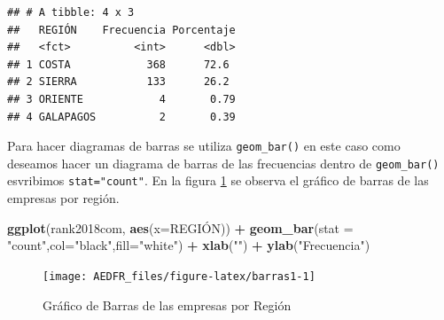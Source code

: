 \documentclass[letterpaper,]{book}
\newenvironment{Shaded}{\begin{snugshade}}{\end{snugshade}}
\newcommand{\DataTypeTok}[1]{\textcolor[rgb]{0.13,0.29,0.53}{#1}}
\newcommand{\DecValTok}[1]{\textcolor[rgb]{0.00,0.00,0.81}{#1}}
\newcommand{\KeywordTok}[1]{\textcolor[rgb]{0.13,0.29,0.53}{\textbf{#1}}}
\newcommand{\NormalTok}[1]{#1}
\newcommand{\OperatorTok}[1]{\textcolor[rgb]{0.81,0.36,0.00}{\textbf{#1}}}
\newcommand{\StringTok}[1]{\textcolor[rgb]{0.31,0.60,0.02}{#1}}
\begin{document}
\begin{Shaded}
\end{Shaded}

\begin{verbatim}
## # A tibble: 4 x 3
##   REGIÓN    Frecuencia Porcentaje
##   <fct>          <int>      <dbl>
## 1 COSTA            368      72.6 
## 2 SIERRA           133      26.2 
## 3 ORIENTE            4       0.79
## 4 GALAPAGOS          2       0.39
\end{verbatim}

Para hacer diagramas de barras se utiliza \texttt{geom\_bar()} en este caso como deseamos hacer un diagrama de barras de las frecuencias dentro de \texttt{geom\_bar()} esvribimos \texttt{stat="count"}. En la figura \ref{fig:barras1} se observa el gráfico de barras de las empresas por región.

\begin{Shaded}
\begin{Highlighting}[]
\KeywordTok{ggplot}\NormalTok{(rank2018com, }\KeywordTok{aes}\NormalTok{(}\DataTypeTok{x=}\NormalTok{REGIÓN)) }\OperatorTok{+}\StringTok{ }
\StringTok{  }\KeywordTok{geom_bar}\NormalTok{(}\DataTypeTok{stat =} \StringTok{"count"}\NormalTok{,}\DataTypeTok{col=}\StringTok{"black"}\NormalTok{,}\DataTypeTok{fill=}\StringTok{"white"}\NormalTok{) }\OperatorTok{+}
\StringTok{  }\KeywordTok{xlab}\NormalTok{(}\StringTok{""}\NormalTok{) }\OperatorTok{+}\StringTok{ }\KeywordTok{ylab}\NormalTok{(}\StringTok{"Frecuencia"}\NormalTok{)}
\end{Highlighting}
\end{Shaded}

\begin{figure}[h!]

{\centering \texttt{[image: AEDFR\_files/figure-latex/barras1-1]} 

}

\caption{Gráfico de Barras de las empresas por Región}\label{fig:barras1}
\end{figure}
\end{document}
